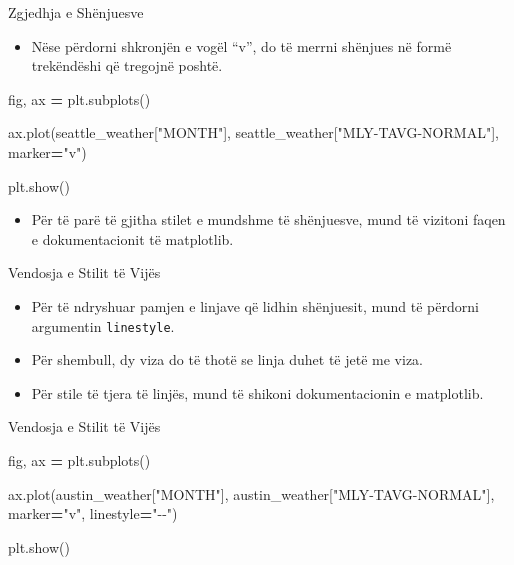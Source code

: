 \documentclass[
  ignorenonframetext,
]{beamer}
\newenvironment{Shaded}{\begin{snugshade}}{\end{snugshade}}
\newcommand{\NormalTok}[1]{#1}
\newcommand{\OperatorTok}[1]{\textcolor[rgb]{0.81,0.36,0.00}{\textbf{#1}}}
\newcommand{\StringTok}[1]{\textcolor[rgb]{0.31,0.60,0.02}{#1}}
\providecommand{\tightlist}{%
  \setlength{\itemsep}{0pt}\setlength{\parskip}{0pt}}
\begin{document}
\begin{frame}[fragile]{Zgjedhja e Shënjuesve}
\protect\hypertarget{zgjedhja-e-shuxebnjuesve}{}
\begin{itemize}
\tightlist
\item
  Nëse përdorni shkronjën e vogël ``v'', do të merrni shënjues në formë
  trekëndëshi që tregojnë poshtë.
\end{itemize}


\begin{Shaded}
\begin{Highlighting}[]
\NormalTok{fig, ax }\OperatorTok{=}\NormalTok{ plt.subplots()}

\NormalTok{ax.plot(seattle\_weather[}\StringTok{"MONTH"}\NormalTok{], seattle\_weather[}\StringTok{"MLY{-}TAVG{-}NORMAL"}\NormalTok{],}
\NormalTok{marker}\OperatorTok{=}\StringTok{"v"}\NormalTok{)}

\NormalTok{plt.show()}
\end{Highlighting}
\end{Shaded}

\begin{itemize}
\tightlist
\item
  Për të parë të gjitha stilet e mundshme të shënjuesve, mund të
  vizitoni faqen e dokumentacionit të matplotlib.
\end{itemize}
\end{frame}

\begin{frame}[fragile]{Vendosja e Stilit të Vijës}
\protect\hypertarget{vendosja-e-stilit-tuxeb-vijuxebs}{}
\begin{itemize}
\item
  Për të ndryshuar pamjen e linjave që lidhin shënjuesit, mund të
  përdorni argumentin \texttt{linestyle}.
\item
  Për shembull, dy viza do të thotë se linja duhet të jetë me viza.
\item
  Për stile të tjera të linjës, mund të shikoni dokumentacionin e
  matplotlib.
\end{itemize}
\end{frame}

\begin{frame}[fragile]{Vendosja e Stilit të Vijës}
\protect\hypertarget{vendosja-e-stilit-tuxeb-vijuxebs-1}{}

\begin{Shaded}
\begin{Highlighting}[]
\NormalTok{fig, ax }\OperatorTok{=}\NormalTok{ plt.subplots()}

\NormalTok{ax.plot(austin\_weather[}\StringTok{"MONTH"}\NormalTok{], austin\_weather[}\StringTok{"MLY{-}TAVG{-}NORMAL"}\NormalTok{],}
\NormalTok{marker}\OperatorTok{=}\StringTok{"v"}\NormalTok{, linestyle}\OperatorTok{=}\StringTok{"{-}{-}"}\NormalTok{)}

\NormalTok{plt.show()}
\end{Highlighting}
\end{Shaded}
\end{frame}
\end{document}
